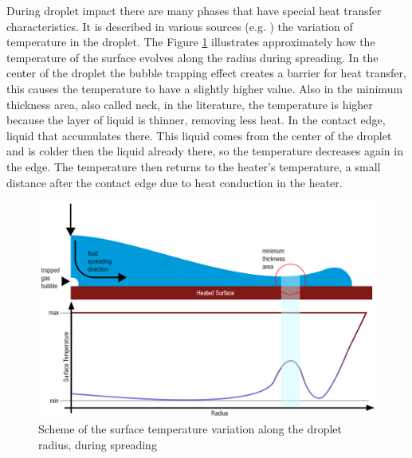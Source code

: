 \par During droplet impact there are many phases that have special heat transfer characteristics. It is described in various sources (e.g. \cite{strotos2011non}) the variation of temperature in the droplet. The Figure \ref{fig:tempvar} illustrates approximately how the temperature of the surface evolves along the radius during spreading. In the center of the droplet the bubble trapping effect creates a barrier for heat transfer, this causes the temperature to have a slightly higher value. Also in the minimum thickness area, also called neck, in the literature, the temperature is higher because the layer of liquid is thinner, removing less heat. In the contact edge, liquid that accumulates there. This liquid comes from the center of the droplet and is colder then the liquid already there, so the temperature decreases again in the edge. The temperature then returns to the heater's temperature, a small distance after the contact edge due to heat conduction in the heater.

\begin{figure}[h]
\centering
\includegraphics[width=1\linewidth]{Figures/2.Chapter/tempvar.png}
\caption {Scheme of the surface temperature variation along the droplet radius, during spreading}
\label{fig:tempvar}
\end{figure}



